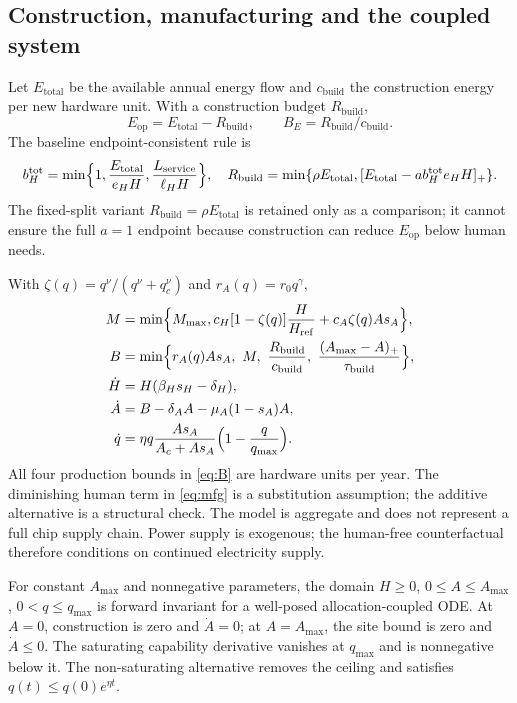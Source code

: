 \documentclass[11pt]{article}
\begin{document}
\subsection{Construction, manufacturing and the coupled system}
Let $E_{\mathrm{total}}$ be the available annual energy flow and $c_{\mathrm{build}}$ the construction energy per new hardware unit. With a construction budget $R_{\mathrm{build}}$,
\begin{equation}
E_{\mathrm{op}}=E_{\mathrm{total}}-R_{\mathrm{build}},\qquad
B_E=R_{\mathrm{build}}/c_{\mathrm{build}}.
\label{eq:budget}
\end{equation}
The baseline endpoint-consistent rule is
\begin{equation}
b_H^{\mathrm{tot}}=\min\Bigl\{1,\frac{E_{\mathrm{total}}}{e_HH},\frac{L_{\mathrm{service}}}{\ell_HH}\Bigr\},
\quad
R_{\mathrm{build}}=\min\{\rho E_{\mathrm{total}},[E_{\mathrm{total}}-ab_H^{\mathrm{tot}}e_HH]_+\}.
\label{eq:endpoint}
\end{equation}
The fixed-split variant $R_{\mathrm{build}}=\rho E_{\mathrm{total}}$ is retained only as a comparison; it cannot ensure the full $a=1$ endpoint because construction can reduce $E_{\mathrm{op}}$ below human needs.

With $\zeta(q)=q^{\nu}/(q^{\nu}+q_c^{\nu})$ and $r_A(q)=r_0q^{\gamma}$,
\begin{align}
M&=\min\Bigl\{M_{\max},c_H[1-\zeta(q)]\frac{H}{H_{\mathrm{ref}}}+c_A\zeta(q)As_A\Bigr\},\label{eq:mfg}\\
B&=\min\Bigl\{r_A(q)As_A,\ M,\ \frac{R_{\mathrm{build}}}{c_{\mathrm{build}}},\
\frac{(A_{\max}-A)_+}{\tau_{\mathrm{build}}}\Bigr\},\label{eq:B}\\
\dot H&=H(\beta_Hs_H-\delta_H),\label{eq:Hdot}\\
\dot A&=B-\delta_AA-\mu_A(1-s_A)A,\label{eq:Adot}\\
\dot q&=\eta q\frac{As_A}{A_c+As_A}\Bigl(1-\frac{q}{q_{\max}}\Bigr).\label{eq:qdot}
\end{align}
All four production bounds in \eqref{eq:B} are hardware units per year. The diminishing human term in \eqref{eq:mfg} is a substitution assumption; the additive alternative is a structural check. The model is aggregate and does not represent a full chip supply chain. Power supply is exogenous; the human-free counterfactual therefore conditions on continued electricity supply.

For constant $A_{\max}$ and nonnegative parameters, the domain $H\ge0$, $0\le A\le A_{\max}$, $0<q\le q_{\max}$ is forward invariant for a well-posed allocation-coupled ODE. At $A=0$, construction is zero and $\dot A=0$; at $A=A_{\max}$, the site bound is zero and $\dot A\le0$. The saturating capability derivative vanishes at $q_{\max}$ and is nonnegative below it. The non-saturating alternative removes the ceiling and satisfies $q(t)\le q(0)e^{\eta t}$.
\end{document}
